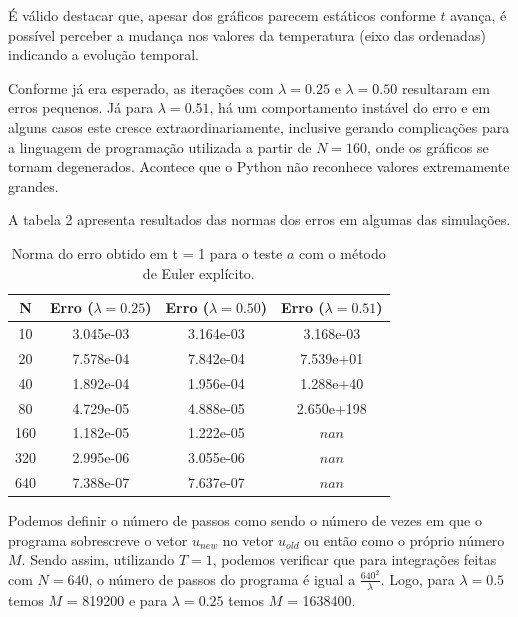 \documentclass[a4paper, 12pt]{article}
\begin{document}
É válido destacar que, apesar dos gráficos parecem estáticos conforme $t$ avança, é possível perceber a mudança nos valores da temperatura (eixo das ordenadas) indicando a evolução temporal.

Conforme já era esperado, as iterações com $\lambda = 0.25$ e $\lambda = 0.50$ resultaram em erros pequenos. Já para $\lambda = 0.51$, há um comportamento instável do erro e em alguns casos este cresce extraordinariamente, inclusive gerando complicações para a linguagem de programação utilizada a partir de $N=160$, onde os gráficos se tornam degenerados. Acontece que o Python não reconhece valores extremamente grandes. 

A tabela 2 apresenta resultados das normas dos erros em algumas das simulações.

\begin{table}[!h]
    \centering
    \begin{tabular}{|c|c|c|c|}
    \hline                               %
    N & Erro ($\lambda = 0.25$) & Erro ($\lambda = 0.50$) & Erro ($\lambda = 0.51$) \\
    \hline
    10  &  3.045e-03 & 3.164e-03 & 3.168e-03 \\
    20  &  7.578e-04 & 7.842e-04 & 7.539e+01 \\
    40  &  1.892e-04 & 1.956e-04 & 1.288e+40 \\
    80  &  4.729e-05 & 4.888e-05 & 2.650e+198 \\
    160 &  1.182e-05 & 1.222e-05 & $nan$ \\
    320 &  2.995e-06 & 3.055e-06 & $nan$ \\
    640 &  7.388e-07 & 7.637e-07 & $nan$ \\
    \hline
    \end{tabular}
    \caption{Norma do erro obtido em t = 1 para o teste $a$ com o método de Euler explícito.}
\end{table}

Podemos definir o número de passos como sendo o número de vezes em que o programa sobrescreve o vetor $u_{new}$ no vetor $u_{old}$ ou então como o próprio número $M$. Sendo assim, utilizando $T=1$, podemos verificar que para integrações feitas com $N=640$, o número de passos do programa é igual a $\frac{640^2}{\lambda}$. Logo, para $\lambda = 0.5$ temos $M$ = 819200 e para $\lambda = 0.25$ temos $M$ = 1638400. 
\end{document}
